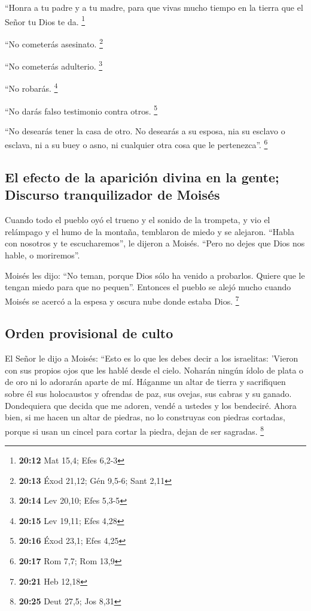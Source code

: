  ``Honra a tu padre y a tu madre, para que vivas mucho
tiempo en la tierra que el Señor tu Dios te da. \footnote{\textbf{20:12}
  Mat 15,4; Efes 6,2-3}

 ``No cometerás asesinato. \footnote{\textbf{20:13} Éxod
  21,12; Gén 9,5-6; Sant 2,11}

 ``No cometerás adulterio. \footnote{\textbf{20:14} Lev
  20,10; Efes 5,3-5}

 ``No robarás. \footnote{\textbf{20:15} Lev 19,11; Efes
  4,28}

 ``No darás falso testimonio contra otros. \footnote{\textbf{20:16}
  Éxod 23,1; Efes 4,25}

 ``No desearás tener la casa de otro. No desearás a su
esposa, nia su esclavo o esclava, ni a su buey o asno, ni cualquier otra
cosa que le pertenezca''. \footnote{\textbf{20:17} Rom 7,7; Rom 13,9}

\hypertarget{el-efecto-de-la-apariciuxf3n-divina-en-la-gente-discurso-tranquilizador-de-moisuxe9s}{%
\subsection{El efecto de la aparición divina en la gente; Discurso
tranquilizador de
Moisés}\label{el-efecto-de-la-apariciuxf3n-divina-en-la-gente-discurso-tranquilizador-de-moisuxe9s}}

 Cuando todo el pueblo oyó el trueno y el sonido de la
trompeta, y vio el relámpago y el humo de la montaña, temblaron de miedo
y se alejaron.  ``Habla con nosotros y te escucharemos'',
le dijeron a Moisés. ``Pero no dejes que Dios nos hable, o moriremos''.

 Moisés les dijo: ``No teman, porque Dios sólo ha venido
a probarlos. Quiere que le tengan miedo para que no pequen''.
 Entonces el pueblo se alejó mucho cuando Moisés se
acercó a la espesa y oscura nube donde estaba Dios. \footnote{\textbf{20:21}
  Heb 12,18}

\hypertarget{orden-provisional-de-culto}{%
\subsection{Orden provisional de
culto}\label{orden-provisional-de-culto}}

 El Señor le dijo a Moisés: ``Esto es lo que les debes
decir a los israelitas: 'Vieron con sus propios ojos que les hablé desde
el cielo.  Noharán ningún ídolo de plata o de oro ni lo
adorarán aparte de mí.  Háganme un altar de tierra y
sacrifiquen sobre él sus holocaustos y ofrendas de paz, sus ovejas, sus
cabras y su ganado. Dondequiera que decida que me adoren, vendé a
ustedes y los bendeciré.  Ahora bien, si me hacen un
altar de piedras, no lo construyas con piedras cortadas, porque si usan
un cincel para cortar la piedra, dejan de ser sagradas. \footnote{\textbf{20:25}
  Deut 27,5; Jos 8,31}

